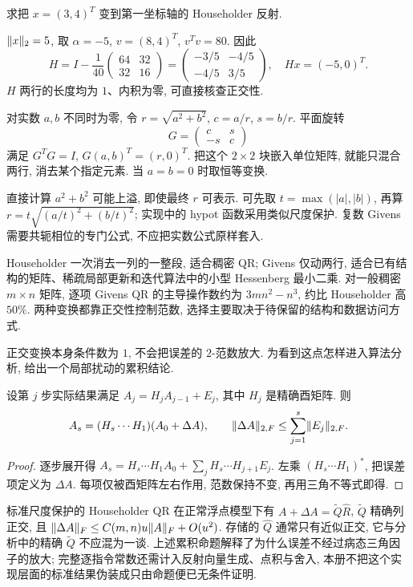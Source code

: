 \begin{example}
求把 $x=(3,4)^T$ 变到第一坐标轴的 Householder 反射.
\end{example}
\begin{solution}
$\lVert x\rVert_2=5$, 取 $\alpha=-5$, $v=(8,4)^T$, $v^Tv=80$. 因此
\[
H=I-\frac1{40}\begin{pmatrix}64&32\\32&16\end{pmatrix}
=\begin{pmatrix}-3/5&-4/5\\-4/5&3/5\end{pmatrix},\quad
Hx=(-5,0)^T.
\]
$H$ 两行的长度均为 $1$、内积为零, 可直接核查正交性.
\end{solution}

对实数 $a,b$ 不同时为零, 令 $r=\sqrt{a^2+b^2}$, $c=a/r$, $s=b/r$. 平面旋转
\[
G=\begin{pmatrix}c&s\\-s&c\end{pmatrix}
\]
满足 $G^TG=I$, $G(a,b)^T=(r,0)^T$. 把这个 $2\times2$ 块嵌入单位矩阵, 就能只混合两行, 消去某个指定元素. 当 $a=b=0$ 时取恒等变换.

直接计算 $a^2+b^2$ 可能上溢, 即使最终 $r$ 可表示. 可先取 $t=\max(|a|,|b|)$, 再算 $r=t\sqrt{(a/t)^2+(b/t)^2}$; 实现中的 hypot 函数采用类似尺度保护. 复数 Givens 需要共轭相位的专门公式, 不应把实数公式原样套入.

Householder 一次消去一列的一整段, 适合稠密 QR; Givens 仅动两行, 适合已有结构的矩阵、稀疏局部更新和迭代算法中的小型 Hessenberg 最小二乘. 对一般稠密 $m\times n$ 矩阵, 逐项 Givens QR 的主导操作数约为 $3mn^2-n^3$, 约比 Householder 高 $50\%$. 两种变换都靠正交性控制范数, 选择主要取决于待保留的结构和数据访问方式.

正交变换本身条件数为 $1$, 不会把误差的 $2$-范数放大. 为看到这点怎样进入算法分析, 给出一个局部扰动的累积结论.
\begin{proposition}\label{prop:orthaccum}
设第 $j$ 步实际结果满足 $A_j=H_jA_{j-1}+E_j$, 其中 $H_j$ 是精确酉矩阵. 则
\[
A_s=(H_s\cdots H_1)(A_0+\Delta A),\qquad
\lVert \Delta A\rVert_{2,F}\le\sum_{j=1}^s\lVert E_j\rVert_{2,F}.
\]
\end{proposition}
\begin{proof}
逐步展开得
$A_s=H_s\cdots H_1A_0+\sum_jH_s\cdots H_{j+1}E_j$.
左乘 $(H_s\cdots H_1)^*$, 把误差项定义为 $\Delta A$. 每项仅被酉矩阵左右作用, 范数保持不变, 再用三角不等式即得.
\end{proof}
标准尺度保护的 Householder QR 在正常浮点模型下有 $A+\Delta A=\widetilde Q\widehat R$, $\widetilde Q$ 精确列正交, 且 $\lVert \Delta A\rVert_F\le C(m,n)u\lVert A\rVert_F+O(u^2)$. 存储的 $\widehat Q$ 通常只有近似正交, 它与分析中的精确 $\widetilde Q$ 不应混为一谈. 上述累积命题解释了为什么误差不经过病态三角因子的放大; 完整逐指令常数还需计入反射向量生成、点积与舍入, 本册不把这个实现层面的标准结果伪装成只由命题便已无条件证明.

